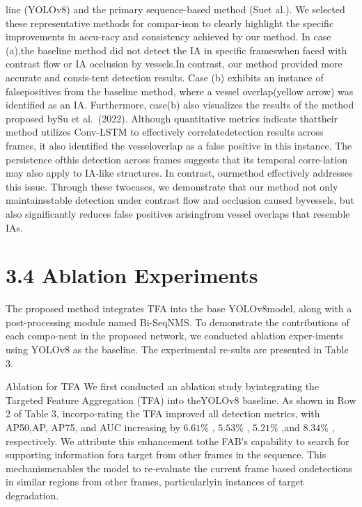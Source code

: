 \documentclass[
  10
]{article}
\begin{document}
line (YOLOv8) and the primary sequence-based method (Suet al.). We
selected these representative methods for compar-ison to clearly
highlight the specific improvements in accu-racy and consistency
achieved by our method. In case (a),the baseline method did not detect
the IA in specific frameswhen faced with contrast flow or IA occlusion
by vessels.In contrast, our method provided more accurate and
consis-tent detection results. Case (b) exhibits an instance of
falsepositives from the baseline method, where a vessel overlap(yellow
arrow) was identified as an IA. Furthermore, case(b) also visualizes the
results of the method proposed bySu et al.~(2022). Although quantitative
metrics indicate thattheir method utilizes Conv-LSTM to effectively
correlatedetection results across frames, it also identified the
vesseloverlap as a false positive in this instance. The persistence
ofthis detection across frames suggests that its temporal corre-lation
may also apply to IA-like structures. In contrast, ourmethod effectively
addresses this issue. Through these twocases, we demonstrate that our
method not only maintainsstable detection under contrast flow and
occlusion caused byvessels, but also significantly reduces false
positives arisingfrom vessel overlaps that resemble IAs.

\section{3.4 Ablation Experiments}\label{ablation-experiments}

The proposed method integrates TFA into the base YOLOv8model, along with
a post-processing module named Bi-SeqNMS. To demonstrate the
contributions of each compo-nent in the proposed network, we conducted
ablation exper-iments using YOLOv8 as the baseline. The experimental
re-sults are presented in Table 3.

Ablation for TFA We first conducted an ablation study byintegrating the
Targeted Feature Aggregation (TFA) into theYOLOv8 baseline. As shown in
Row 2 of Table 3, incorpo-rating the TFA improved all detection metrics,
with AP50,AP, AP75, and AUC increasing by \(6 . 6 1 \%\) ,
\(5 . 5 3 \%\) , \(5 . 2 1 \%\) ,and \(8 . 3 4 \%\) , respectively. We
attribute this enhancement tothe FAB's capability to search for
supporting information fora target from other frames in the sequence.
This mechanismenables the model to re-evaluate the current frame based
ondetections in similar regions from other frames, particularlyin
instances of target degradation.
\end{document}
